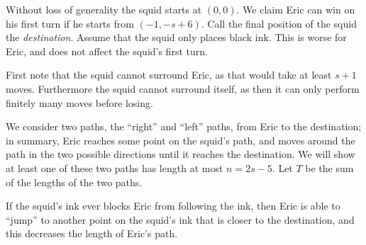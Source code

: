 Without loss of generality the squid starts at $(0,0)$. We claim Eric can win on his first turn if he starts from $(-1,-s+6)$. Call the final position of the squid the \emph{destination}. Assume that the squid only places black ink. This is worse for Eric, and does not affect the squid's first turn.

First note that the squid cannot surround Eric, as that would take at least $s+1$ moves. Furthermore the squid cannot surround itself, as then it can only perform finitely many moves before losing.

We consider two paths, the ``right'' and ``left'' paths, from Eric to the destination; in summary, Eric reaches some point on the squid's path, and moves around the path in the two possible directions until it reaches the destination. We will show at least one of these two paths has length at most $n=2s-5$. Let $T$ be the sum of the lengths of the two paths.
\begin{claim}
    If the squid's ink ever blocks Eric from following the ink, then Eric is able to ``jump'' to another point on the squid's ink that is closer to the destination, and this decreases the length of Eric's path.
\end{claim}

